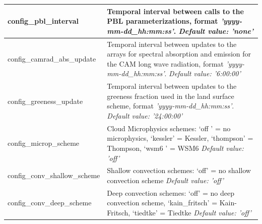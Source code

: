 \documentclass[11pt]{report}
\begin{document}
{\begin{longtable}{|p{2.0in} |p{4.25in}|}
  config\_pbl\_interval & Temporal interval between calls to the PBL parameterizations, format {\em 'yyyy-mm-dd\_hh:mm:ss'}.  \newline 
  {\em Default value: 'none'} \\ \hline

  config\_camrad\_abs\_update & Temporal interval between updates to the arrays for spectral absorption and emission for the CAM long wave radiation, format {\em 'yyyy-mm-dd\_hh:mm:ss'}. \newline 
  {\em Default value: '6:00:00'} \\ \hline

  config\_greeness\_update & Temporal interval between updates to the greeness fraction used in the land surface scheme, format {\em 'yyyy-mm-dd\_hh:mm:ss'}. \newline 
  {\em Default value: '24:00:00'} \\ \hline      

  config\_microp\_scheme & Cloud Microphysics schemes: \newline
                                             `off '  = no microphysics, \newline
                                             `kessler' = Kessler, \newline 
                                             `thompson' = Thompson, \newline
                                             `wsm6       ' = WSM6 \newline
  {\em Default value: 'off'} \\ \hline

  config\_conv\_shallow\_scheme & Shallow convection schemes: \newline
                                             `off' = no shallow convection scheme \newline   
  {\em Default value: 'off'} \\ \hline

  config\_conv\_deep\_scheme & Deep convection schemes: \newline
                                             `off' = no deep convection scheme, \newline
                                             `kain\_fritsch' = Kain-Fritsch, \newline 
                                             `tiedtke' = Tiedtke \newline
  {\em Default value: 'off'} \\ \hline


\end{longtable}}
\end{document}
